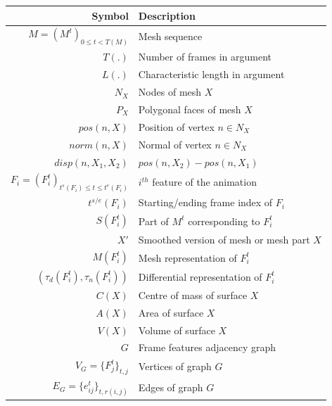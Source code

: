 \documentclass[review]{acmsiggraph}
\begin{document}
\begin{table}[htbp]
\centering
\small
    \begin{tabular}{ rl }
        \hline
        \textbf{Symbol}     & \textbf{Description} \\
        \hline
        $M = (M^t)_{0 \leq t < T(M)}$       & Mesh sequence \\
        $T(.)$              & Number of frames in argument \\
        $L(.)$              & Characteristic length in argument \\
        $N_X$               & Nodes of mesh $X$ \\
        $P_X$               & Polygonal faces of mesh $X$ \\
        $pos(n, X)$         & Position of vertex $n\in N_X$ \\
        $norm(n, X)$        & Normal of vertex $n\in N_X$ \\
        $disp(n, X_1, X_2)$ & $pos(n, X_2) - pos(n, X_1)$ \\
        \hline
        $F_i = (F_i^t)_{t^s(F_i) \leq t \leq t^e(F_i)}$   & $i^{th}$ feature of the animation\\
        $t^{s/e}(F_i)$      & Starting/ending frame index of $F_i$ \\
        $S(F^t_i)$          & Part of $M^t$ corresponding to $F^t_i$ \\
        $X'$                & Smoothed version of mesh or mesh part $X$ \\%
        $M(F^t_i)$          & Mesh representation of $F^t_i$\\%
        $(\tau_d(F^t_i), \tau_n(F^t_i))$ & Differential representation of $F^t_i$\\%
        $C(X)$              & Centre of mass of surface $X$ \\
        $A(X)$              & Area of surface $X$ \\
        $V(X)$              & Volume of surface $X$ \\
        \hline
        $G$                 & Frame features adjacency graph \\
        $V_G = \{F_j^t\}_{t,j}$ & Vertices of graph $G$ \\
        $E_G = \{e^t_{ij}\}_{t, r(i,j)}$ & Edges of graph $G$ \\

\end{tabular}
\end{table}
\end{document}
